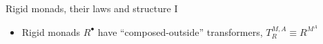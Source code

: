 \documentclass[english]{beamer}
\newcommand{\bef}{\ensuremath\raisebox{2pt}{$\mathsmaller{\mathsmaller{\circ}}$}\hspace{-3.3pt},}
\begin{document}
\begin{frame}{Rigid monads, their laws and structure I}
\begin{itemize}
\begin{itemize}
{\[{R^{A\Rightarrow B} & \times\quad\quad R^{B\Rightarrow C}\quad~\ar[r]\sb(0.5){\text{use }\bowtie} & R^{\left(A\Rightarrow B\right)\times\left(B\Rightarrow C\right)}\ar[r]\sb(0.6){~\text{fmap}\left(\bef\right)} & R^{A\Rightarrow C}
}
\]
}{\small\par}
\item {\footnotesize{}\vspace{-0.3cm}}{\small{}Alternative formulation:
$\text{flm}=\text{fi}\bef\text{pa}$ where $\text{pa}:R^{A\Rightarrow B}\Rightarrow R^{A}\Rightarrow R^{B}$}{\small\par}
\item Then $\text{fi}\bef\text{fo}=\text{id}$. Proof: $\text{fo}\,x\,a=\text{pa}\,x\,\left(\text{pure}\,a\right)$;
set $x^{:R^{A\Rightarrow B}}=\text{fi}\,h^{:A\Rightarrow R^{B}}$
and get $\text{fo}\,x\,a=\text{pa}\,\left(\text{fi}\,h\right)\left(\text{pure}\,a\right)=\text{flm}\,h\left(\text{pure}\,a\right)=h\,a$,
so $\text{fo}\left(\text{fi}\,h\right)=h$ 
\end{itemize}
\item Rigid monads $R^{\bullet}$ have ``composed-outside'' transformers,
$T_{R}^{M,A}\equiv R^{M^{A}}$
\end{itemize}
\end{frame}
\end{document}
